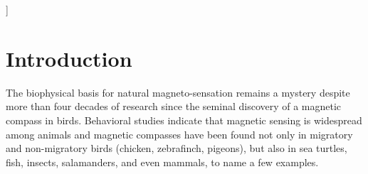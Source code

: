 \documentclass[twoside,twocolumn,9pt]{article}
\begin{document}
  ]

\renewcommand*\rmdefault{bch}\normalfont\upshape
\rmfamily
\section*{}
\vspace{-1cm}





\section{Introduction}
The biophysical basis for natural magneto-sensation remains a mystery despite more than four decades of research since the seminal discovery of a magnetic compass in birds. \cite{Wiltschko72} Behavioral studies indicate that magnetic sensing is widespread among animals and magnetic compasses have been found not only in migratory and non-migratory birds (chicken, zebrafinch, pigeons), but also in sea turtles,\cite{Lohmann1991} fish,\cite{Quinn1980, Walker2006} insects, salamanders, and even mammals, \cite{Begall2013} to name a few examples.
\end{document}
